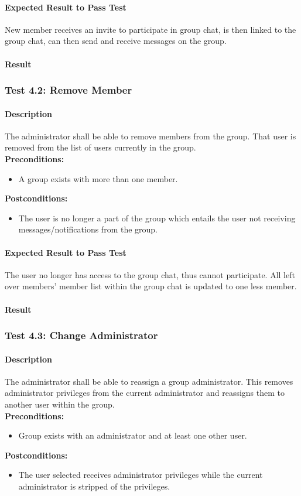 \documentclass[11pt]{article}
\begin{document}
\paragraph{Expected Result to Pass Test}
New member receives an invite to participate in group chat, is then linked to the group chat, can then send and receive messages on the group.
\paragraph{Result}
\subsubsection{Test 4.2: Remove Member}
\paragraph{Description}
The administrator shall be able to remove members from the group. That user is removed from the list of users currently in the group.\\
\textbf{Preconditions:} 
\begin{itemize}
\item A group exists with more than one member.
\end{itemize}
\textbf{Postconditions:}
\begin{itemize}
\item The user is no longer a part of the group which entails the user not receiving messages/notifications from the group.
\end{itemize}
\paragraph{Expected Result to Pass Test}
The user no longer has access to the group chat, thus cannot participate. All left over members' member list within the group chat is updated to one less member.
\paragraph{Result}

\subsubsection{Test 4.3: Change Administrator}
\paragraph{Description}
The administrator shall be able to reassign a group
administrator. This removes administrator privileges from the current administrator and reassigns them to another user within the group.\\
\textbf{Preconditions:} 
\begin{itemize}
\item Group exists with an administrator and at least
one other user.
\end{itemize}
\textbf{Postconditions:}
\begin{itemize}
\item The user selected receives administrator privileges while the current administrator is stripped of the privileges.
\end{itemize}
\end{document}
